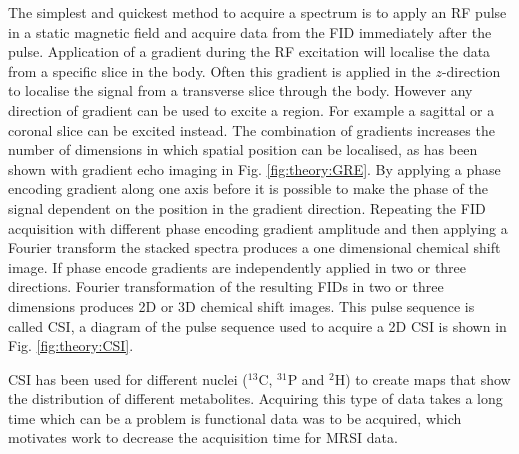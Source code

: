 The simplest and quickest method to acquire a spectrum is to apply an \ac{RF} pulse in a static magnetic field and acquire data from the FID immediately after the pulse. Application of a gradient during the \ac{RF} excitation will localise the data from a specific slice in the body. Often this gradient is applied in the $z$-direction to localise the signal from a transverse slice through the body. However any direction of gradient can be used to excite a region. For example a sagittal or a coronal slice can be excited instead. The combination of gradients increases the number of dimensions in which spatial position can be localised, as has been shown with gradient echo imaging in Fig. \ref{fig:theory:GRE}. By applying a phase encoding gradient along one axis before it is possible to make the phase of the signal dependent on the position in the gradient direction. Repeating the \ac{FID} acquisition with different phase encoding gradient amplitude and then applying a Fourier transform the stacked spectra produces a one dimensional chemical shift image. If phase encode gradients are independently applied in two or three directions. Fourier transformation of the resulting \ac{FID}s in two or three dimensions produces 2D or 3D chemical shift images. This pulse sequence is called \ac{CSI}, a diagram of the pulse sequence used to acquire a 2D \ac{CSI} is shown in Fig. \ref{fig:theory:CSI}. 



\ac{CSI} has been used for different nuclei ($^{13}$C, $^{31}$P and $^2$H) to create maps that show the distribution of different metabolites. Acquiring this type of data takes a long time which can be a problem is functional data was to be acquired, which motivates work to decrease the acquisition time for \ac{MRSI} data.


